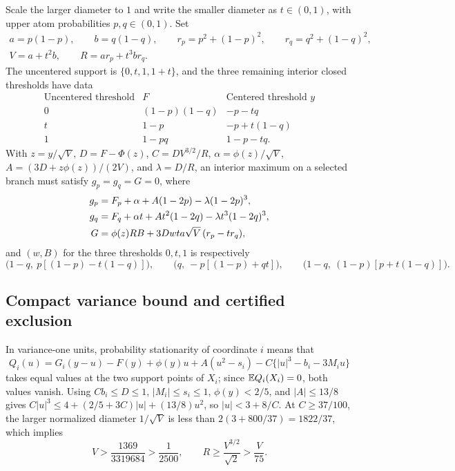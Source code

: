 Scale the larger diameter to $1$ and write the smaller diameter as
$t\in(0,1)$, with upper atom probabilities $p,q\in(0,1)$. Set
\begin{gather*}
 a=p(1-p),\qquad b=q(1-q),\qquad
 r_p=p^2+(1-p)^2,\qquad r_q=q^2+(1-q)^2,\\
 V=a+t^2b,\qquad R=ar_p+t^3br_q.
\end{gather*}
The uncentered support is $\{0,t,1,1+t\}$, and the three remaining interior
closed thresholds have data
\[
 \begin{array}{c|c|c}
 \text{Uncentered threshold}&F&\text{Centered threshold }y\\\hline
 0&(1-p)(1-q)&-p-tq\\
 t&1-p&-p+t(1-q)\\
 1&1-pq&1-p-tq.
 \end{array}
\]
With $z=y/\sqrt V$, $D=F-\Phi(z)$, $C=DV^{3/2}/R$, $\alpha=\phi(z)/\sqrt V$,
$A=(3D+z\phi(z))/(2V)$, and $\lambda=D/R$, an interior maximum on a selected
branch must satisfy $g_p=g_q=G=0$, where
\begin{align}
 g_p&=F_p+\alpha+A(1-2p)-\lambda(1-2p)^3,\notag\\
 g_q&=F_q+\alpha t+At^2(1-2q)-\lambda t^3(1-2q)^3,\notag\\
 G&=\phi(z)RB+3Dwt a\sqrt V\,(r_p-tr_q),                \label{eq:gap-gradient}
\end{align}
and $(w,B)$ for the three thresholds $0,t,1$ is respectively
\[
 \bigl(1-q,\ p[(1-p)-t(1-q)]\bigr),\qquad
 \bigl(q,\ -p[(1-p)+qt]\bigr),\qquad
 \bigl(1-q,\ (1-p)[p+t(1-q)]\bigr).
\]

\subsection{Compact variance bound and certified exclusion}

In variance-one units, probability stationarity of coordinate $i$ means that
\[
 Q_i(u)=G_i(y-u)-F(y)+\phi(y)u+A(u^2-s_i)
                 -C\bigl\{|u|^3-b_i-3M_i u\bigr\}
\]
takes equal values at the two support points of $X_i$; since $\mathbb E Q_i(X_i)=0$,
both values vanish. Using $Cb_i\le D\le1$, $|M_i|\le s_i\le1$, $\phi(y)<2/5$,
and $|A|\le13/8$ gives $C|u|^3\le4+(2/5+3C)|u|+(13/8)u^2$, so $|u|<3+8/C$.
At $C\ge37/100$, the larger normalized diameter $1/\sqrt V$ is less than
$2(3+800/37)=1822/37$, which implies
\begin{equation}\label{eq:two-compact-domain}
 V>\frac{1369}{3319684}>\frac1{2500},\qquad
 R\ge \frac{V^{3/2}}{\sqrt2}>\frac{V}{75}.
\end{equation}

